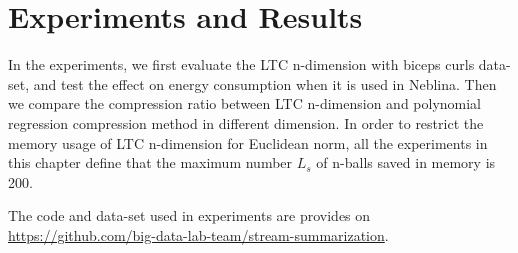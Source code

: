 \chapter{Experiments and Results}
\label{chap:expsAndResults}
In the experiments, we first evaluate the LTC n-dimension with biceps curls
data-set, and test the effect on energy consumption when it is used in Neblina.
Then we compare the compression ratio between LTC n-dimension and polynomial
regression compression method in different dimension. In order to restrict the
memory usage of LTC n-dimension for Euclidean norm, all the experiments in this
chapter define that the maximum number $L_s$ of n-balls saved in memory is 200.

The code and data-set used in experiments are provides on
\url{https://github.com/big-data-lab-team/stream-summarization}. 





